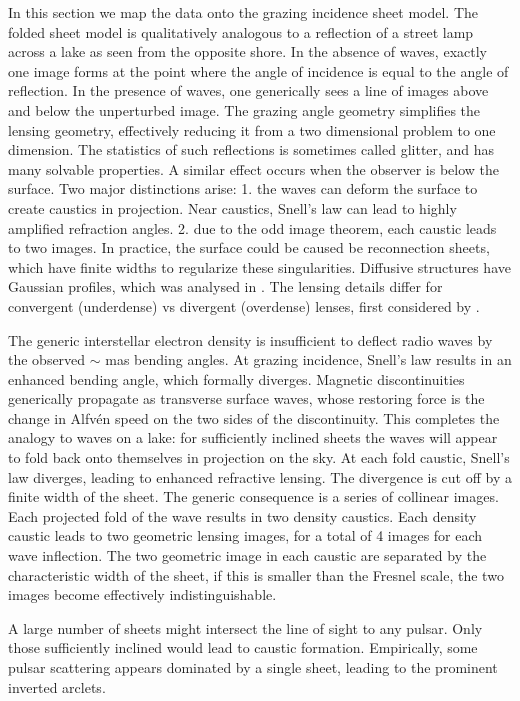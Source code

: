 \documentclass[useAMS,usenatbib]{mn2e}
\begin{document}
In this section we map the data onto the grazing incidence sheet
model.  The folded sheet model is qualitatively analogous to a
reflection of a street lamp across a lake as seen from the opposite
shore.  In the absence of waves, exactly one image forms at the point
where the angle of incidence is equal to the angle of reflection.  In
the presence of waves, one generically sees a line of images above and
below the unperturbed image.  The grazing angle geometry simplifies
the lensing geometry, effectively reducing it from a two dimensional problem to
one dimension.  The statistics of such reflections is sometimes called
glitter, and has many solvable
properties\citep{LonguetHiggins1960}. 
A similar effect occurs when the
observer is below the surface.  Two major distinctions arise: 1. the
waves can deform the surface to create caustics in projection. Near
caustics, Snell's law can lead to highly amplified refraction
angles. 2. due to the odd image theorem, each caustic leads to two
images.  In practice, the surface could be caused be reconnection
sheets\citep{2015MNRAS.450.3201B}, which have finite widths to
regularize these singularities. Diffusive structures have Gaussian
profiles, which was analysed in \citep{2012MNRAS.421L.132P}.  The
lensing details differ for convergent (underdense) vs divergent
(overdense) lenses, first considered by \citep{1998ApJ...496..253C}.

The generic interstellar electron density is insufficient to deflect
radio waves by the observed $\sim$ mas bending angles. At grazing
incidence, Snell's law results in an enhanced bending angle, which
formally diverges.  Magnetic discontinuities generically propagate
as transverse surface waves, whose restoring force is the change in Alfv\'en
speed on the two sides of the discontinuity. This completes the
analogy to waves on a lake: for sufficiently inclined sheets the waves
will appear to fold back onto themselves in projection on the sky.  At
each fold caustic, Snell's law diverges, leading to enhanced
refractive lensing.  The divergence is cut off by a finite width of
the sheet.  The generic consequence is a series of collinear images.
Each projected fold of the wave results in two density caustics.  Each density
caustic leads to two geometric lensing images, for a total of 4 images
for each wave inflection.  The two geometric image in each caustic are
separated by the characteristic width of the sheet, if this is smaller
than the Fresnel scale, the two images become effectively
indistinguishable. 

A large number of sheets might intersect the line of sight to any
pulsar. Only those sufficiently inclined would lead to caustic
formation. Empirically, some pulsar scattering appears dominated by a
single sheet, leading to the prominent inverted
arclets\citep{2001ApJ...549L..97S}.
\end{document}
